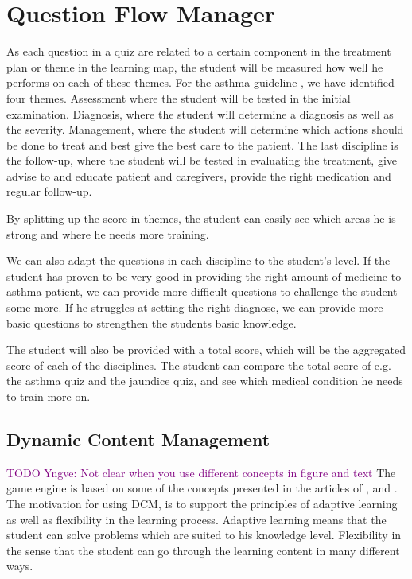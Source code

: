 \section{Question Flow Manager}



As each question in a quiz are related to a certain component in the treatment plan or theme in the learning map, the student will be measured how well he performs on each of these themes. For the asthma guideline \parencite{RepublicofKeny2016}, we have identified four themes. Assessment where the student will be tested in the initial examination. Diagnosis, where the student will determine a diagnosis as well as the severity. Management, where the student will determine which actions should be done to treat and best give the best care to the patient. The last discipline is the follow-up, where the student will be tested in evaluating the treatment, give advise to and educate patient and caregivers, provide the right medication and regular follow-up.

By splitting up the score in themes, the student can easily see which areas he is strong and where he needs more training. 



We can also adapt the questions in each discipline to the student's level. If the student has proven to be very good in providing the right amount of medicine to asthma patient, we can provide more difficult questions to challenge the student some more. If he struggles at setting the right diagnose, we can provide more basic questions to strengthen the students basic knowledge. 




The student will also be provided with a total score, which will be the aggregated score of each of the disciplines. The student can compare the total score of e.g. the asthma quiz and the jaundice quiz, and see which medical condition he needs to train more on.


\subsection{Dynamic Content Management}
\textcolor{purple}{TODO Yngve: Not clear when you use different concepts in figure and text}
The game engine is based on some of the concepts presented in the articles of \textcite{Eide2008}, \textcite{Kristensen2011} and \textcite{Kristensen2013}. The motivation for using DCM, is to support the principles of adaptive learning as well as flexibility in the learning process. Adaptive learning means that the student can solve problems which are suited to his knowledge level. Flexibility in the sense that the student can go through the learning content in many different ways.

